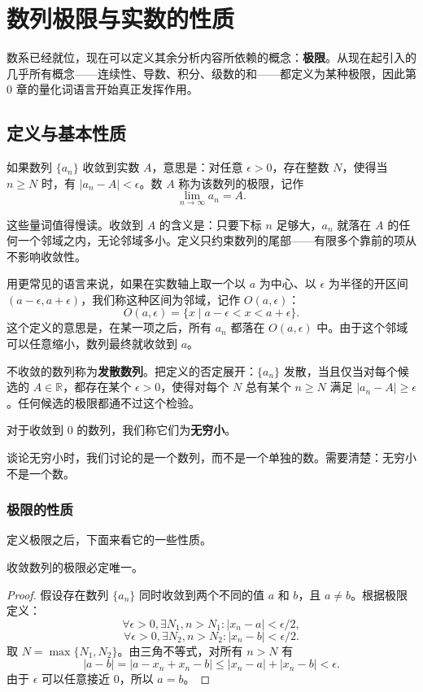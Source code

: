 \section{数列极限与实数的性质}

数系已经就位，现在可以定义其余分析内容所依赖的概念：\textbf{极限}。从现在起引入的几乎所有概念——连续性、导数、积分、级数的和——都定义为某种极限，因此第 0 章的量化词语言开始真正发挥作用。

\subsection{定义与基本性质}

\begin{definition}[数列极限]
如果数列 $\{a_n\}$ 收敛到实数 $A$，意思是：对任意 $\epsilon>0$，存在整数 $N$，使得当 $n\ge N$ 时，有 $|a_n-A|<\epsilon$。数 $A$ 称为该数列的极限，记作
\[
\lim_{n\to \infty}a_n=A.
\]
\end{definition}
这些量词值得慢读。收敛到 $A$ 的含义是：只要下标 $n$ 足够大，$a_n$ 就落在 $A$ 的任何一个邻域之内，无论邻域多小。定义只约束数列的尾部——有限多个靠前的项从不影响收敛性。

用更常见的语言来说，如果在实数轴上取一个以 $a$ 为中心、以 $\epsilon$ 为半径的开区间 $(a-\epsilon,a+\epsilon)$，我们称这种区间为邻域，记作 $O(a,\epsilon)$：
\[
O(a,\epsilon)=\{x\mid a-\epsilon<x<a+\epsilon\}.
\]
这个定义的意思是，在某一项之后，所有 $a_n$ 都落在 $O(a,\epsilon)$ 中。由于这个邻域可以任意缩小，数列最终就收敛到 $a$。

不收敛的数列称为\textbf{发散数列}。把定义的否定展开：$\{a_n\}$ 发散，当且仅当对每个候选的 $A\in\mathbb{R}$，都存在某个 $\epsilon>0$，使得对每个 $N$ 总有某个 $n\ge N$ 满足 $|a_n-A|\ge\epsilon$。任何候选的极限都通不过这个检验。

对于收敛到 $0$ 的数列，我们称它们为\textbf{无穷小}。

\begin{remark}
谈论无穷小时，我们讨论的是一个数列，而不是一个单独的数。需要清楚：无穷小不是一个数。
\end{remark}

\subsubsection{极限的性质}

定义极限之后，下面来看它的一些性质。

\begin{theorem}[极限的唯一性]
收敛数列的极限必定唯一。
\end{theorem}
\begin{proof}
假设存在数列 $\{a_n\}$ 同时收敛到两个不同的值 $a$ 和 $b$，且 $a\ne b$。根据极限定义：
\[
\forall \epsilon>0,\exists N_1,n>N_1:|x_n-a|<\epsilon/2,
\]
\[
\forall \epsilon>0,\exists N_2,n>N_2:|x_n-b|<\epsilon/2.
\]
取 $N=\max\{N_1,N_2\}$。由三角不等式，对所有 $n>N$ 有
\[
|a-b|=|a-x_n+x_n-b|\le |x_n-a|+|x_n-b|<\epsilon.
\]
由于 $\epsilon$ 可以任意接近 $0$，所以 $a=b$。
\end{proof}

